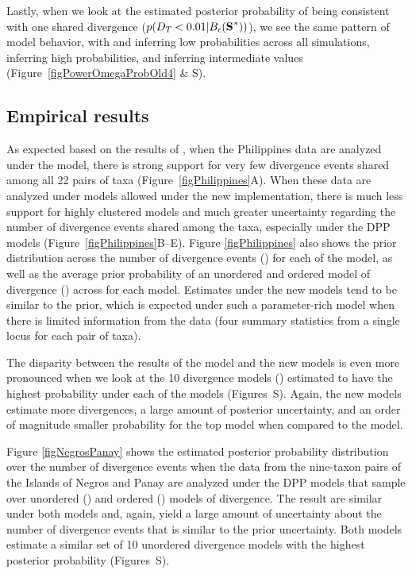 Lastly, when we look at the estimated posterior probability of
\divTimeDispersion being consistent with one shared divergence
($p(\divTimeDispersion < 0.01 | \ssSpace)$), we see the same pattern of model
behavior, with \modelDPP and \modelUniform inferring low probabilities across
all simulations, \modelOld inferring high probabilities, and \modelUshaped
inferring intermediate values
(Figure~\ref{figPowerOmegaProbOld4} \& 
S).

\subsection*{Empirical results}
As expected based on the results of \citet{Oaks2012}, when the Philippines data
are analyzed under the \empModelOld model, there is strong support for very few
divergence events shared among all 22 pairs of taxa
(Figure~\ref{figPhilippines}A).
When these data are analyzed under models allowed under the new implementation,
there is much less support for highly clustered models and much greater
uncertainty regarding the number of divergence events shared among the taxa,
especially under the DPP models (Figure~\ref{figPhilippines}B--E).
Figure \ref{figPhilippines} also shows the prior distribution across the number
of divergence events (\divTimeNum) for each of the model, as well as the
average prior probability of an unordered and ordered model of divergence
(\divTimeIndexVector) across \divTimeNum for each model.
Estimates under the new models tend to be similar to the prior, which is
expected under such a parameter-rich model when there is limited information
from the data (four summary statistics from a single locus for each pair of
taxa).

The disparity between the results of the \empModelOld model and the new models
is even more pronounced when we look at the 10 divergence models
(\divTimeMapVector) estimated to have the highest probability under each of the
models
(Figures~S).
Again, the new models estimate more divergences, a large amount of posterior
uncertainty, and an order of magnitude smaller probability for the top model
when compared to the \empModelOld model.

Figure \ref{figNegrosPanay} shows the estimated posterior probability
distribution over the number of divergence events when the data from the
nine-taxon pairs of the Islands of Negros and Panay are analyzed under the DPP
models that sample over unordered (\npModelDPP) and ordered
(\npModelDPPOrdered) models of divergence.
The result are similar under both models and, again, yield a large amount of
uncertainty about the number of divergence events that is similar to the prior
uncertainty.
Both models estimate a similar set of 10 unordered divergence models with the
highest posterior probability
(Figures~S).

